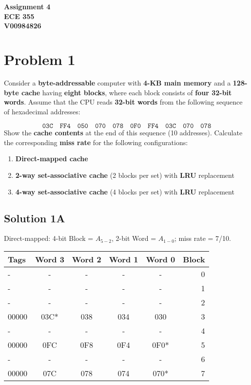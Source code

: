 \documentclass{article}
\begin{document}
\begin{center}
    \textbf{\LARGE Assignment 4} \\[1ex]
    \textbf{ECE 355} \\[1ex]
    \textbf{V00984826} \\[2ex]
\end{center}

\section*{Problem 1}

Consider a \textbf{byte-addressable} computer with \textbf{4-KB main memory} and a \textbf{128-byte cache} having \textbf{eight blocks}, where each block consists of \textbf{four 32-bit words}. Assume that the CPU reads \textbf{32-bit words} from the following sequence of hexadecimal addresses:

\[ 
\texttt{03C} \quad \texttt{FF4} \quad \texttt{050} \quad \texttt{070} \quad \texttt{078} \quad \texttt{0F0} \quad \texttt{FF4} \quad \texttt{03C} \quad \texttt{070} \quad \texttt{078}
\]
Show the \textbf{cache contents} at the end of this sequence (10 addresses). Calculate the corresponding \textbf{miss rate} for the following configurations:
    \begin{enumerate}
        \item \textbf{Direct-mapped cache}
        \item \textbf{2-way set-associative cache} (2 blocks per set) with \textbf{LRU} replacement
        \item \textbf{4-way set-associative cache} (4 blocks per set) with \textbf{LRU} replacement
    \end{enumerate}

\subsection*{Solution 1A}
Direct-mapped: 4-bit Block = $A_{5-2}$, 2-bit Word = $A_{1-0}$; miss rate = 7/10.
\begin{center}
\begin{tabular}{|l|c|c|c|c|r|}
\hline
Tags & Word 3 & Word 2 & Word 1 & Word 0 & Block\\\hline
- & - & - & - & - & 0 \\\hline
- & - & - & - & - & 1 \\\hline
- & - & - & - & - & 2 \\\hline
00000 & 03C* & 038 & 034 & 030 & 3 \\\hline
- & - & - & - & - & 4 \\\hline
00000 & 0FC & 0F8 & 0F4 & 0F0* & 5 \\\hline
- & - & - & - & - & 6 \\\hline
00000 & 07C & 078 & 074 & 070* & 7 \\\hline
\end{tabular}
\end{center}
\end{document}
